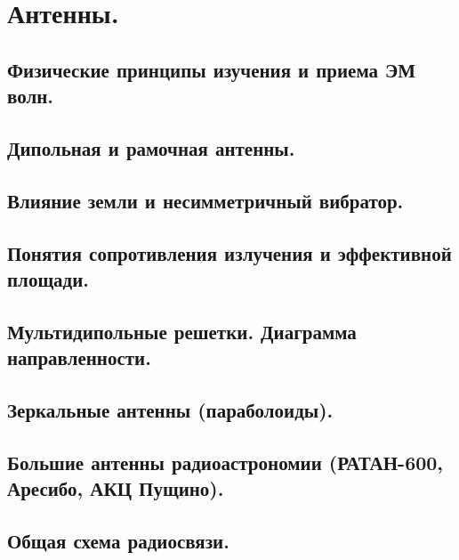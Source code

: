 \documentclass[../main/main.tex]{subfiles}
\begin{document}
\section{Антенны.}

\subsection{Физические принципы изучения и приема ЭМ волн.}

\subsection{Дипольная и рамочная антенны.}

\subsection{Влияние земли и несимметричный вибратор.}

\subsection{Понятия сопротивления излучения и эффективной площади.}

\subsection{Мультидипольные решетки. Диаграмма направленности.}

\subsection{Зеркальные антенны (параболоиды).}

\subsection{Большие антенны радиоастрономии (РАТАН-600, Аресибо, АКЦ Пущино).}

\subsection{Общая схема радиосвязи.}
\end{document}
